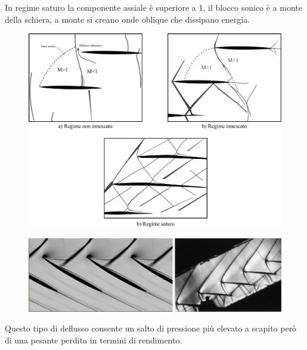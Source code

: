 In regime saturo la componente assiale è superiore a 1, il blocco sonico è a monte della schiera, a monte si creano onde oblique che dissipano energia.

\begin{figure}[h!]
\centering
  \includegraphics[width=.8\textwidth]{fig/Schlieren1.pdf}
\caption{}
\label{fig:Schlieren1}
\end{figure}
\begin{figure}[h!]
\centering
  \includegraphics[width=.8\textwidth]{fig/Schlieren2.png}
\caption{}
\label{fig:Schlieren2}
\end{figure}
Questo tipo di deflusso consente un salto di pressione più elevato a scapito però di una pesante perdita in termini di rendimento. 
